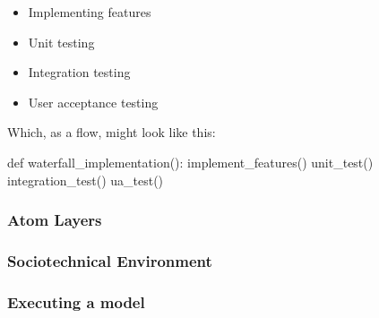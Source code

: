 \begin{itemize}
    \item Implementing features
    \item Unit testing
    \item Integration testing
    \item User acceptance testing
\end{itemize} \par
Which, as a flow, might look like this:
\begin{pyglist}[language = python, encoding = utf8]
def waterfall_implementation():
    implement_features()
    unit_test()
    integration_test()
    ua_test()
\end{pyglist}

\subsubsection{Atom Layers}


\subsubsection{Sociotechnical Environment}

\subsubsection{Executing a model}

